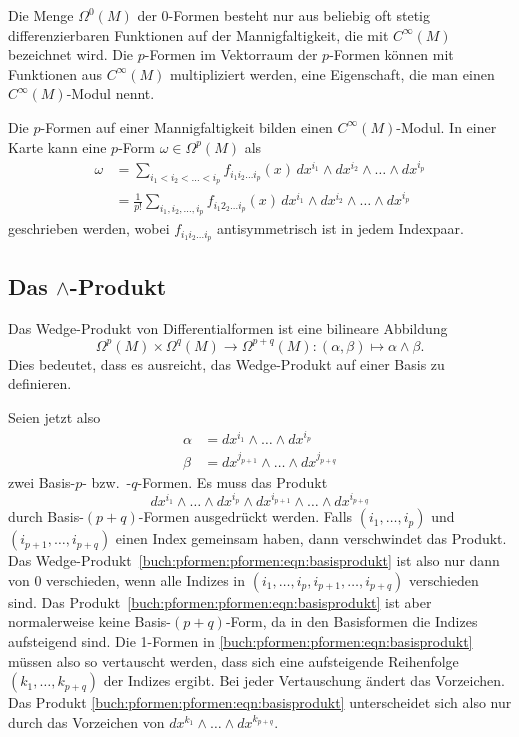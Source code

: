 Die Menge $\Omega^0(M)$ der $0$-Formen besteht nur aus beliebig oft stetig
differenzierbaren Funktionen auf der Mannigfaltigkeit, die mit
$C^\infty(M)$ bezeichnet wird.
%
Die $p$-Formen im Vektorraum der $p$-Formen können mit Funktionen aus
$C^\infty(M)$ multipliziert werden, eine Eigenschaft, die man einen
$C^\infty(M)$-Modul nennt.

\begin{satz}
Die $p$-Formen auf einer Mannigfaltigkeit bilden einen $C^\infty(M)$-Modul.
In einer Karte kann eine $p$-Form $\omega\in \Omega^p(M)$ als
\begin{align*}
\omega
&=
\sum_{i_1<i_2<\dots< i_p}
f_{i_1 i_2\dots i_p}(x)
\, dx^{i_1}\wedge dx^{i_2}\wedge\dots\wedge dx^{i_p}
\\
&=
\frac{1}{p!}
\sum_{i_1,i_2,\dots,i_p}
f_{i_1 2_2\dots i_p}(x)
\, dx^{i_1}\wedge dx^{i_2}\wedge\dots\wedge dx^{i_p}
\end{align*}
geschrieben werden, wobei $f_{i_1 i_2\dots i_p}$  antisymmetrisch ist in jedem
Indexpaar.
\end{satz}

%
%
\subsection{Das $\wedge$-Produkt}
Das Wedge-Produkt von Differentialformen ist eine bilineare Abbildung
\[
\Omega^p(M)\times \Omega^q(M) \to \Omega^{p+q}(M)
:
(\alpha,\beta) \mapsto \alpha\wedge\beta.
\]
Dies bedeutet, dass es ausreicht, das Wedge-Produkt auf einer Basis
zu definieren.

Seien jetzt also
\begin{align*}
\alpha &= dx^{i_1}\wedge\dots\wedge dx^{i_p} \\
\beta  &= dx^{j_{p+1}}\wedge\dots\wedge dx^{j_{p+q}}
\end{align*}
zwei Basis-$p$- bzw.~-$q$-Formen.
Es muss das Produkt
\begin{equation}
dx^{i_1}\wedge\dots\wedge dx^{i_p}
\wedge
dx^{i_{p+1}}\wedge\dots\wedge dx^{i_{p+q}}
\label{buch:pformen:pformen:eqn:basisprodukt}
\end{equation}
durch Basis-$(p+q)$-Formen ausgedrückt werden.
Falls $(i_1,\dots,i_p)$ und $(i_{p+1},\dots,i_{p+q})$ einen Index gemeinsam
haben, dann verschwindet das Produkt.
Das Wedge-Produkt~\eqref{buch:pformen:pformen:eqn:basisprodukt}
ist also nur dann von $0$ verschieden, wenn alle Indizes in
$(i_1,\dots,i_p,i_{p+1},\dots,i_{p+q})$ verschieden sind.
Das Produkt~\eqref{buch:pformen:pformen:eqn:basisprodukt} ist aber
normalerweise keine Basis-$(p+q)$-Form, da in den Basisformen die
Indizes aufsteigend sind.
Die 1-Formen in \eqref{buch:pformen:pformen:eqn:basisprodukt} müssen
also so vertauscht werden, dass sich eine aufsteigende Reihenfolge
$(k_1,\dots,k_{p+q})$
der Indizes ergibt.
Bei jeder Vertauschung ändert das Vorzeichen.
Das Produkt \eqref{buch:pformen:pformen:eqn:basisprodukt} unterscheidet
sich also nur durch das Vorzeichen von 
\(
dx^{k_1}\wedge\dots\wedge dx^{k_{p+q}}
\).

